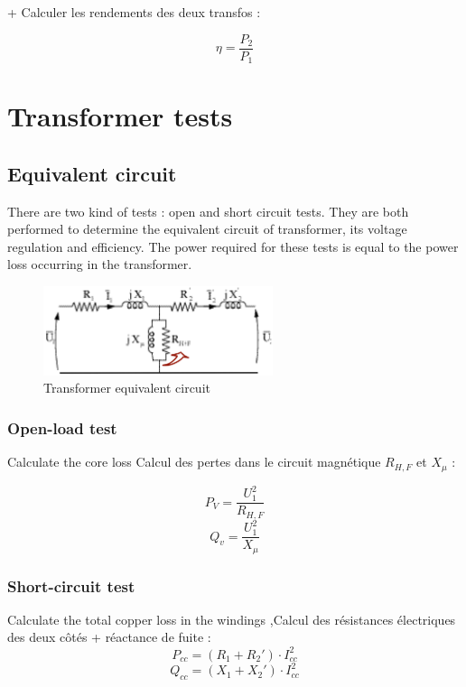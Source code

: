 \documentclass[12pt,a4paper]{report}
\begin{document}
+ Calculer les rendements des deux transfos :

\begin{equation}
   \eta = \frac{P_2}{P_1}
\end{equation}

\section{Transformer tests}

\subsection{Equivalent circuit}
There are two kind of tests : open and short circuit tests. They are both performed to determine the equivalent circuit of transformer, its voltage regulation and efficiency.
The power required for these tests is equal to the power loss occurring in the transformer.

 \begin{figure}[h]
    \centering
    \includegraphics[width=0.6\textwidth]{equivalent_circuit.PNG}
    \caption{Transformer equivalent circuit}
    \label{fig:equivalent_circuit}
\end{figure}

\subsubsection{Open-load test}
Calculate the core loss Calcul des pertes dans le circuit magnétique  $R_{H,F}$ et $X_\mu$ :

\begin{equation}
   P_V = \frac{U_1^2}{R_{H,F}}
\end{equation}
\begin{equation}
   Q_v = \frac{U_1^2}{X_{\mu}}
\end{equation}

\subsubsection{Short-circuit test}
Calculate the total copper loss in the windings ,Calcul des résistances électriques des deux côtés + réactance de fuite :
\begin{equation}
P_{cc} = (R_1 + R_2') \cdot I_{cc}^2
\end{equation}
\begin{equation}
Q_{cc} = (X_1 + X_2') \cdot I_{cc}^2
\end{equation}
\end{document}
